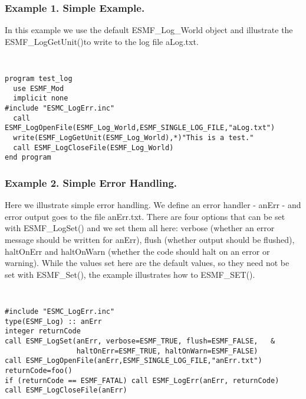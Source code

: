 %




\subsubsection{Example 1. Simple Example.}

In this example we use the default ESMF\_Log\_World object and illustrate
the ESMF\_LogGetUnit()to write to
the log file aLog.txt.

{\tt
\begin{verbatim}
program test_log
  use ESMF_Mod
  implicit none
#include "ESMC_LogErr.inc"
  call ESMF_LogOpenFile(ESMF_Log_World,ESMF_SINGLE_LOG_FILE,"aLog.txt")
  write(ESMF_LogGetUnit(ESMF_Log_World),*)"This is a test."
  call ESMF_LogCloseFile(ESMF_Log_World)
end program
\end{verbatim}
\tt}

\subsubsection{Example 2. Simple Error Handling.}

Here we illustrate simple error handling.  We define an error handler - anErr -
and error output goes to the
file anErr.txt.  There are four options that can be set with ESMF\_LogSet()
and we set them all here: verbose (whether an
error message should be written for anErr), flush (whether output should be 
flushed), haltOnErr and haltOnWarn (whether the code should halt on
an error or warning).  While the values set here are the default
values, so they need not be set with ESMF\_Set(), the example illustrates how
to ESMF\_SET().

{\tt
\begin{verbatim}
#include "ESMC_LogErr.inc" 
type(ESMF_Log) :: anErr
integer returnCode 
call ESMF_LogSet(anErr, verbose=ESMF_TRUE, flush=ESMF_FALSE,   &
                 haltOnErr=ESMF_TRUE, haltOnWarn=ESMF_FALSE)
call ESMF_LogOpenFile(anErr,ESMF_SINGLE_LOG_FILE,"anErr.txt")
returnCode=foo()
if (returnCode == ESMF_FATAL) call ESMF_LogErr(anErr, returnCode) 
call ESMF_LogCloseFile(anErr)
\end{verbatim}
\tt}

